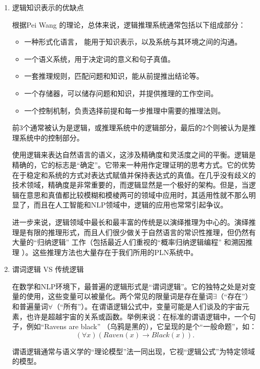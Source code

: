 \begin{enumerate}
\item {逻辑知识表示的优缺点}

根据Pei Wang \cite{Wang2006}的理论，总体来说，逻辑推理系统通常包括以下组成部分：

\begin{itemize}
\item 一种形式化语言， 能用于知识表示，以及系统与其环境之间的沟通。
\item 一个语义系统，用于决定词的意义和句子真值。
\item 一套推理规则，匹配问题和知识，能从前提推出结论等。
\item 一个存储器，可以储存问题和知识，并提供推理的工作空间。
\item 一个控制机制，负责选择前提和每一步推理中需要的推理法则。
\end{itemize}

\noindent 前3个通常被认为是逻辑，或推理系统中的逻辑部分，最后的2个则被认为是推理系统中的控制部分。

使用逻辑来表达自然语言的语义，这涉及精确度和灵活度之间的平衡。逻辑是精确的，它的标志是“确定”。它带来一种用作定理证明的思考方式。它的优势在于稳定和系统的方式对表达式赋值并保持表达式的真值。在几乎没有歧义的技术领域，精确度是非常重要的，而逻辑显然是一个极好的架构。但是，当逻辑在意思和真值都比较模糊和模棱两可的领域中应用时，其适用性就不那么明显了，而且在人工智能和NLP领域中，逻辑的应用也常常引起争议。

进一步来说，逻辑领域中最长和最丰富的传统是以演绎推理为中心的。演绎推理是有限的推理形式，而且人们很少做关于自然语言的常识性推理，但仍然有大量的“归纳逻辑”\cite{Muggleton1994} \cite{Holland1989}工作（包括最近人们重视的“概率归纳逻辑编程” \cite{Riguzzi2014}和溯因推理\cite{Queiroz2005} \cite{Menzies1996}）。这些推理方法也大量存在于我们所用的PLN系统中。

\item {谓词逻辑 VS 传统逻辑}

在数学和NLP环境下，最普遍的逻辑形式是“谓词逻辑”。它的独特之处是对变量的使用，这些变量可以被量化。两个常见的限量词是存在量词$\exists$（“存在”）和普遍量词$\forall$（“所有”）。在谓语逻辑公式中，变量可能是人们谈及的宇宙元素，也许是超越宇宙的关系或函数。举例来说：在标准的谓语逻辑中，一个句子，例如“Ravens are black” （乌鸦是黑的），它呈现的是个“一般命题”，如：
$$
(\forall x)(Raven(x) \rightarrow Black(x)).
$$

谓语逻辑通常与语义学的“理论模型”法一同出现，它视“逻辑公式”为特定领域的模型\cite{Muller2009}。



\end{enumerate}
